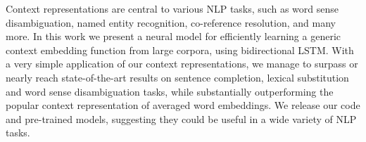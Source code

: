 Context representations are central to various NLP tasks, such as word sense disambiguation, named entity recognition, co-reference resolution, and many more. In this work we present a neural model for efficiently learning a generic context embedding function from large corpora, using bidirectional LSTM. With a very simple application of our context representations, we manage to surpass or nearly reach state-of-the-art results on sentence completion, lexical substitution and word sense disambiguation tasks, while substantially outperforming the popular context representation of averaged word embeddings. We release our code and pre-trained models, suggesting they could be useful in a wide variety of NLP tasks.
